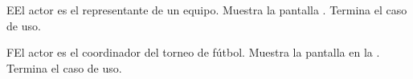 	
	\begin{UCtrayectoriaA}{E}{El actor es el representante de un equipo.}
		\UCpaso Muestra la pantalla .
		\UCpaso Termina el caso de uso.
	\end{UCtrayectoriaA}
	
	\begin{UCtrayectoriaA}{F}{El actor es el coordinador del torneo de fútbol.}
		\UCpaso Muestra la pantalla  en la .
		\UCpaso Termina el caso de uso.
	\end{UCtrayectoriaA}
